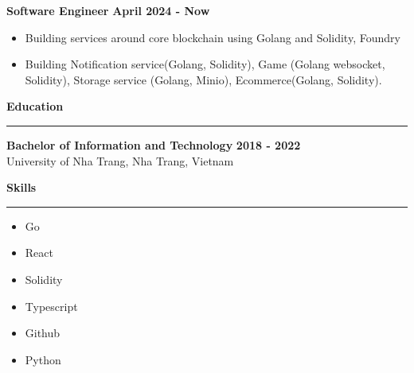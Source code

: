 \documentclass{article}
\newcommand{\separator}{\bigskip\hrule\bigskip}
\newcommand{\goicon}{\faCode \hspace{0.1cm} Go}
\newcommand{\reacticon}{\faCode \hspace{0.1cm} React}
\newcommand{\githubicon}{\faGithub \hspace{0.1cm} Github}
\newcommand{\pythonicon}{\faCode \hspace{0.1cm} Solidity}
\newcommand{\solidity}{\faCode \hspace{0.1cm} Python}
\newcommand{\typescripticon}{\faCode \hspace{0.1cm} Typescript}
\newcommand{\sectionheader}[1]{\noindent\large\textbf{#1}\separator}
\newenvironment{bullets}{
    \begin{itemize}
    \setlength{\itemsep}{0pt}
    \setlength{\parskip}{0pt}
    \setlength{\parsep}{0pt}
}{
    \end{itemize}
}
\begin{document}
\textbf{Software Engineer} \hfill 
\textbf{April 2024 - Now}\\
\begin{bullets}
    \item Building services around core blockchain using Golang and Solidity, Foundry 
    \item Building Notification service(Golang, Solidity), Game (Golang websocket, Solidity), Storage service (Golang, Minio), Ecommerce(Golang, Solidity).
\end{bullets}
\sectionheader{Education}

\textbf{Bachelor of Information and Technology} \hfill \textbf{2018 - 2022}\\
University of Nha Trang, Nha Trang, Vietnam

\vspace{\baselineskip}

\sectionheader{Skills}

\begin{bullets}
    \item \goicon \hspace{0.1cm}
    \item \reacticon \hspace{0.1cm}
    \item \pythonicon \hspace{0.1cm}
    \item \typescripticon \hspace{0.1cm}
    \item \githubicon \hspace{0.1cm}
    \item \solidity \hspace{0.1cm}

\end{bullets}
\end{document}
